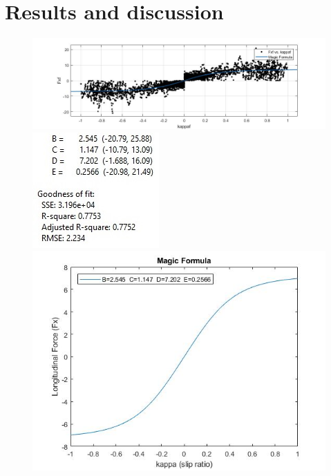 \section{Results and discussion}

\begin{figure}
	\centering
		\includegraphics[scale=0.2]{figure/MagicFormulaFrontBags}
		\includegraphics[scale=0.2]{figure/MagicFormulaFrontBagsFitnumbers}
		\includegraphics[scale=0.2]{figure/MagicFormulaFrontBagsPic}
\end{figure}
